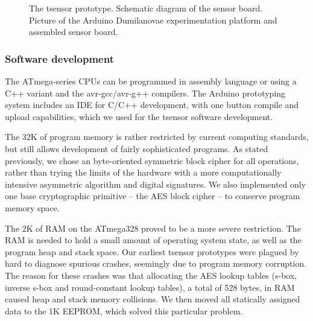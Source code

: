 \begin{figure}[!t]
\centerline{
} 
\caption{The tsensor prototype. 
 Schematic diagram of the sensor board. 
 Picture of the Arduino Dumilanovae experimentation platform and assembled sensor board.}
\label{fig:tsensor}
\end{figure}

\subsubsection{Software development} 
\label{tsensor-sdev}

The ATmega-series CPUs can be programmed in assembly language or using a C++ variant and the avr-gcc/avr-g++ compilers. The Arduino prototyping system includes an IDE for C/C++ development, with one button compile and upload capabilities, which we used for the tsensor software development.

The 32K of program memory is rather restricted by current computing standards, but still allows development of fairly sophisticated programs. As stated previously, we chose an byte-oriented symmetric block cipher for all operations, rather than trying the limits of the hardware with a more computationally intensive asymmetric algorithm and digital signatures. We also implemented only one base cryptographic primitive -- the AES block cipher -- to conserve program memory space.

The 2K of RAM on the ATmega328 proved to be a more severe restriction. The RAM is needed to hold a small amount of operating system state, as well as the program heap and stack space. Our earliest tsensor prototypes were plagued by hard to diagnose spurious crashes, seemingly due to program memory corruption. The reason for these crashes was that allocating the AES lookup tables (s-box, inverse s-box and round-constant lookup tables), a total of 528 bytes, in RAM caused heap and stack memory collisions. We then moved all statically assigned data to the 1K EEPROM, which solved this particular problem.

